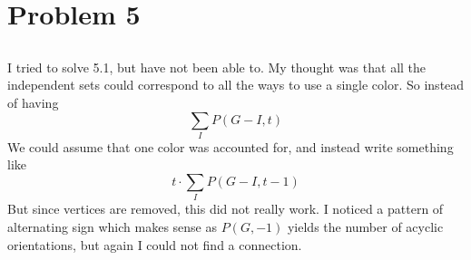 \documentclass[a4paper]{article}
\begin{document}
\section{Problem 5}
\subsection{}
I tried to solve 5.1, but have not been able to. My thought was that all the independent sets could correspond to all the ways to use a single color. So instead of having
$$
\sum_I P(G-I, t)
$$
We could assume that one color was accounted for, and instead write something like
$$
t\cdot \sum_I P(G-I, t-1)
$$
But since vertices are removed, this did not really work. I noticed a pattern of alternating sign which makes sense as $P(G, -1)$ yields the number of acyclic orientations, but again I could not find a connection.
\end{document}
